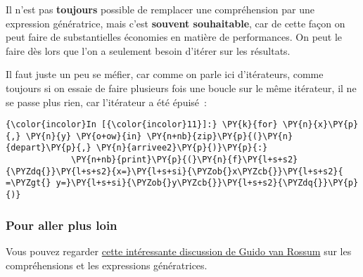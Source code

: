     Il n'est pas \textbf{toujours} possible de remplacer une compréhension
par une expression génératrice, mais c'est \textbf{souvent souhaitable},
car de cette façon on peut faire de substantielles économies en matière
de performances. On peut le faire dès lors que l'on a seulement besoin
d'itérer sur les résultats.

    Il faut juste un peu se méfier, car comme on parle ici d'itérateurs,
comme toujours si on essaie de faire plusieurs fois une boucle sur le
même itérateur, il ne se passe plus rien, car l'itérateur a été épuisé~:

    \begin{Verbatim}[commandchars=\\\{\}]
{\color{incolor}In [{\color{incolor}11}]:} \PY{k}{for} \PY{n}{x}\PY{p}{,} \PY{n}{y} \PY{o+ow}{in} \PY{n+nb}{zip}\PY{p}{(}\PY{n}{depart}\PY{p}{,} \PY{n}{arrivee2}\PY{p}{)}\PY{p}{:}
             \PY{n+nb}{print}\PY{p}{(}\PY{n}{f}\PY{l+s+s2}{\PYZdq{}}\PY{l+s+s2}{x=}\PY{l+s+si}{\PYZob{}x\PYZcb{}}\PY{l+s+s2}{ =\PYZgt{} y=}\PY{l+s+si}{\PYZob{}y\PYZcb{}}\PY{l+s+s2}{\PYZdq{}}\PY{p}{)}
\end{Verbatim}


    \hypertarget{pour-aller-plus-loin}{%
\subsubsection{Pour aller plus loin}\label{pour-aller-plus-loin}}

    Vous pouvez regarder
\href{http://python-history.blogspot.fr/2010/06/from-list-comprehensions-to-generator.html}{cette
intéressante discussion de Guido van Rossum} sur les compréhensions et
les expressions génératrices.


    
    
    
